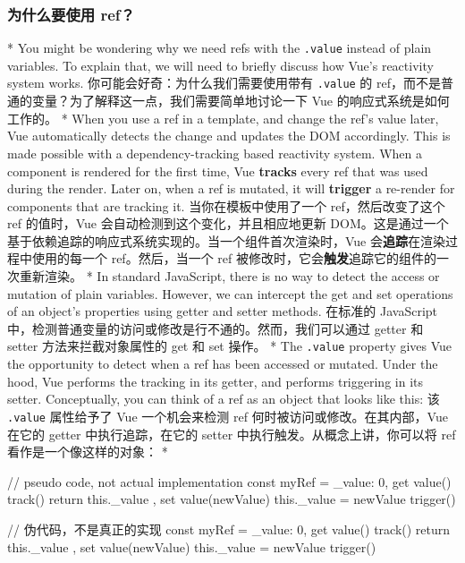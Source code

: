 \begin{paracol}{2}
\subsubsection{为什么要使用 ref？}
\switchcolumn[0]*%
You might be wondering why we need refs with the \texttt{.value} instead
of plain variables. To explain that, we will need to briefly discuss how
Vue's reactivity system works.
\switchcolumn
你可能会好奇：为什么我们需要使用带有 \texttt{.value} 的
ref，而不是普通的变量？为了解释这一点，我们需要简单地讨论一下 Vue
的响应式系统是如何工作的。
\switchcolumn[0]*%
When you use a ref in a template, and change the ref's value later, Vue
automatically detects the change and updates the DOM accordingly. This
is made possible with a dependency-tracking based reactivity system.
When a component is rendered for the first time, Vue \textbf{tracks}
every ref that was used during the render. Later on, when a ref is
mutated, it will \textbf{trigger} a re-render for components that are
tracking it.
\switchcolumn
当你在模板中使用了一个 ref，然后改变了这个 ref 的值时，Vue
会自动检测到这个变化，并且相应地更新
DOM。这是通过一个基于依赖追踪的响应式系统实现的。当一个组件首次渲染时，Vue
会\textbf{追踪}在渲染过程中使用的每一个 ref。然后，当一个 ref
被修改时，它会\textbf{触发}追踪它的组件的一次重新渲染。
\switchcolumn[0]*%
In standard JavaScript, there is no way to detect the access or mutation
of plain variables. However, we can intercept the get and set operations
of an object's properties using getter and setter methods.
\switchcolumn
在标准的 JavaScript
中，检测普通变量的访问或修改是行不通的。然而，我们可以通过 getter 和
setter 方法来拦截对象属性的 get 和 set 操作。
\switchcolumn[0]*%
The \texttt{.value} property gives Vue the opportunity to detect when a
ref has been accessed or mutated. Under the hood, Vue performs the
tracking in its getter, and performs triggering in its setter.
Conceptually, you can think of a ref as an object that looks like this:
\switchcolumn
该 \texttt{.value} 属性给予了 Vue 一个机会来检测 ref
何时被访问或修改。在其内部，Vue 在它的 getter 中执行追踪，在它的 setter
中执行触发。从概念上讲，你可以将 ref 看作是一个像这样的对象：
\switchcolumn[0]*%
\begin{codeJs}
// pseudo code, not actual implementation
const myRef = {
    _value: 0,
    get value() {
    track()
    return this._value
    },
    set value(newValue) {
    this._value = newValue
    trigger()
    }
}
\end{codeJs}
\switchcolumn
\begin{codeJs}
// 伪代码，不是真正的实现
const myRef = {
    _value: 0,
    get value() {
    track()
    return this._value
    },
    set value(newValue) {
    this._value = newValue
    trigger()
    }
}
\end{codeJs}


\end{paracol}

